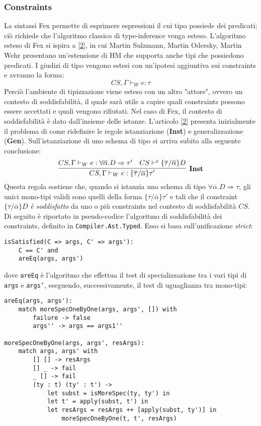 \documentclass[10pt,a4paper]{article}
\begin{document}
\hypertarget{Constraints}{\subsubsection{Constraints}}
La sintassi Fex permette di esprimere espressioni il cui tipo possiede dei predicati; ciò richiede che l'algoritmo
classico di type-inference venga esteso. L'algoritmo esteso di Fex si ispira a \hyperlink{bibl2}{[2]}, in cui Martin Sulzmann,
Martin Odersky, Martin Wehr presentano un'estensione di HM che supporta anche tipi che possiedono predicati. I giudizi
di tipo vengono estesi con un'ipotesi aggiuntiva sui constraints e avranno la forma:
\[ CS, \Gamma \vdash_W e : \tau \]
Perciò l'ambiente di tipizzazione viene esteso con un altro "attore", ovvero un contesto di soddisfabilità, il quale sarà
utile a capire quali constraints possono essere accettati e quali vengono rifiutati. Nel caso
di Fex, il contesto di soddisfabilità è dato dall'insieme delle istanze.
L'articolo \hyperlink{bibl2}{[2]} presenta inizialmente il problema di come ridefinire le regole istanziazione
(\textbf{Inst}) e generalizzazione (\textbf{Gen}).
Sull'istanziazione di uno schema di tipo si arriva subito alla seguente conclusione:
\[ \infer[\textbf{Inst}]{CS, \Gamma \vdash_W e : \{ \overline{\tau} / \overline{\alpha} \}\tau'}{CS, \Gamma \vdash_W e : \forall \overline{\alpha}. D \Rightarrow \tau' & CS \vdash^e \{ \overline{\tau} / \overline{\alpha} \} D} \]
Questa regola sostiene che, quando si istanzia uno schema di tipo $ \forall \overline{\alpha}. D \Rightarrow \tau $, gli
unici mono-tipi validi sono quelli della forma $ \{ \overline{\tau} / \overline{\alpha} \} \tau' $ e tali che il constraint
$ \{ \overline{\tau} / \overline{\alpha} \}D $ \textit{è soddisfatto} da uno o più constraints nel contesto di
soddisfabilità $ CS $.
Di seguito è riportato in pseudo-codice l'algoritmo di soddisfabilità dei constraints, definito in
\texttt{Compiler.Ast.Typed}. Esso si basa sull'unificazione \textit{strict}:
\begin{lstlisting}
isSatisfied(C => args, C' => args'):
    C == C' and
    areEq(args, args')
\end{lstlisting}
dove \texttt{areEq} è l'algoritmo che effettua il test di specializzazione tra i vari tipi di \texttt{args}
e \texttt{args'}, eseguendo, successivamente, il test di uguaglianza tra mono-tipi:
\begin{lstlisting}
areEq(args, args'):
    match moreSpecOneByOne(args, args', []) with
        failure -> false
        args'' -> args == args1''

moreSpecOneByOne(args, args', resArgs):
    match args, args' with
        [] [] -> resArgs
        [] _ -> fail
        _ [] -> fail
        (ty : t) (ty' : t') ->
            let subst = isMoreSpec(ty, ty') in
            let t' = apply(subst, t') in
            let resArgs = resArgs ++ [apply(subst, ty')] in
                moreSpecOneByOne(t, t', resArgs)
\end{lstlisting}
\end{document}

